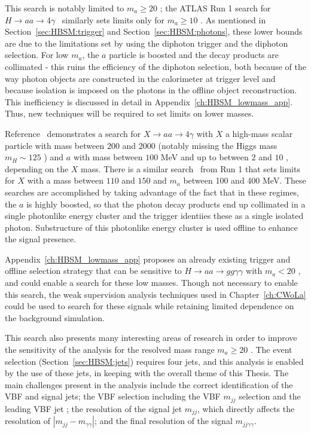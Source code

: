 This search is notably limited to $m_a\ge20$ \GeV{}; the ATLAS Run 1 search for $H\rightarrow aa \to 4\gamma$~\cite{Aad:2015bua} similarly sets limits only for $m_a\ge10$ \GeV{}.
As mentioned in Section~\ref{sec:HBSM:trigger} and Section~\ref{sec:HBSM:photons}, these lower bounds are due to the limitations set by using the diphoton trigger and the diphoton selection.
For low $m_a$, the $a$ particle is boosted and the decay products are collimated - this ruins the efficiency of the diphoton selection, both because of the way photon objects are constructed in the calorimeter at trigger level and because isolation is imposed on the photons in the offline object reconstruction.
This inefficiency is discussed in detail in Appendix~\ref{ch:HBSM_lowmass_app}.
Thus, new techniques will be required to set limits on lower masses.

Reference~\cite{Aaboud:2018djx} demonstrates a search for $X\rightarrow aa\rightarrow 4\gamma$ with $X$ a high-mass scalar particle with mass between $200$ and $2000$ \GeV{} (notably missing the Higgs mass $m_H\sim 125$ \GeV{}) and $a$ with mass between $100$ MeV and up to between $2$ and $10$ \GeV{}, depending on the $X$ mass.
There is a similar search~\cite{ATLAS-CONF-2012-079} from Run 1 that sets limits for $X$ with a mass between $110$ and $150$ \GeV{} and $m_a$ between 100 and 400 MeV.
These searches are accomplished by taking advantage of the fact that in these regimes, the $a$ is highly boosted, so that the photon decay products end up collimated in a single photonlike energy cluster and the trigger identiies these as a single isolated photon.
Substructure of this photonlike energy cluster is used offline to enhance the signal presence.

Appendix~\ref{ch:HBSM_lowmass_app} proposes an already existing trigger and offline selection strategy that can be sensitive to $H\rightarrow aa\rightarrow gg\gamma\gamma$ with $m_a<20$ \GeV{}, and could enable a search for these low masses.
Though not necessary to enable this search, the weak supervision analysis techniques used in Chapter~\ref{ch:CWoLa} could be used to search for these signals while retaining limited dependence on the background simulation.


This search also presents many interesting areas of research in order to improve the sensitivity of the analysis for the resolved mass range $m_a\ge 20$ \GeV{}.
The event selection (Section~\ref{sec:HBSM:jets}) requires four jets, and this analysis is enabled by the use of these jets, in keeping with the overall theme of this Thesis.
The main challenges present in the analysis include the correct identification of the VBF and signal jets; the VBF selection including the VBF $m_{jj}$ selection and the leading VBF jet \pt{}; the resolution of the signal jet $m_{jj}$, which directly affects the resolution of $|m_{jj}-m_{\gamma\gamma}|$; and the final resolution of the signal $m_{jj\gamma\gamma}$.

